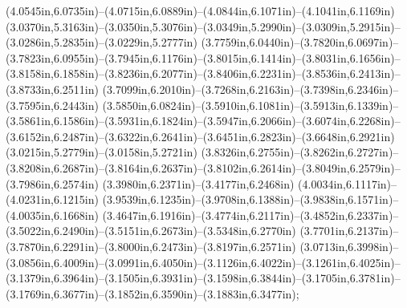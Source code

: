 (4.0545in,6.0735in)--(4.0715in,6.0889in)--(4.0844in,6.1071in)--(4.1041in,6.1169in) (3.0370in,5.3163in)--(3.0350in,5.3076in)--(3.0349in,5.2990in)--(3.0309in,5.2915in)--(3.0286in,5.2835in)--(3.0229in,5.2777in) (3.7759in,6.0440in)--(3.7820in,6.0697in)--(3.7823in,6.0955in)--(3.7945in,6.1176in)--(3.8015in,6.1414in)--(3.8031in,6.1656in)--(3.8158in,6.1858in)--(3.8236in,6.2077in)--(3.8406in,6.2231in)--(3.8536in,6.2413in)--(3.8733in,6.2511in) (3.7099in,6.2010in)--(3.7268in,6.2163in)--(3.7398in,6.2346in)--(3.7595in,6.2443in) (3.5850in,6.0824in)--(3.5910in,6.1081in)--(3.5913in,6.1339in)--(3.5861in,6.1586in)--(3.5931in,6.1824in)--(3.5947in,6.2066in)--(3.6074in,6.2268in)--(3.6152in,6.2487in)--(3.6322in,6.2641in)--(3.6451in,6.2823in)--(3.6648in,6.2921in) (3.0215in,5.2779in)--(3.0158in,5.2721in) (3.8326in,6.2755in)--(3.8262in,6.2727in)--(3.8208in,6.2687in)--(3.8164in,6.2637in)--(3.8102in,6.2614in)--(3.8049in,6.2579in)--(3.7986in,6.2574in) (3.3980in,6.2371in)--(3.4177in,6.2468in) (4.0034in,6.1117in)--(4.0231in,6.1215in) (3.9539in,6.1235in)--(3.9708in,6.1388in)--(3.9838in,6.1571in)--(4.0035in,6.1668in) (3.4647in,6.1916in)--(3.4774in,6.2117in)--(3.4852in,6.2337in)--(3.5022in,6.2490in)--(3.5151in,6.2673in)--(3.5348in,6.2770in) (3.7701in,6.2137in)--(3.7870in,6.2291in)--(3.8000in,6.2473in)--(3.8197in,6.2571in) (3.0713in,6.3998in)--(3.0856in,6.4009in)--(3.0991in,6.4050in)--(3.1126in,6.4022in)--(3.1261in,6.4025in)--(3.1379in,6.3964in)--(3.1505in,6.3931in)--(3.1598in,6.3844in)--(3.1705in,6.3781in)--(3.1769in,6.3677in)--(3.1852in,6.3590in)--(3.1883in,6.3477in);
